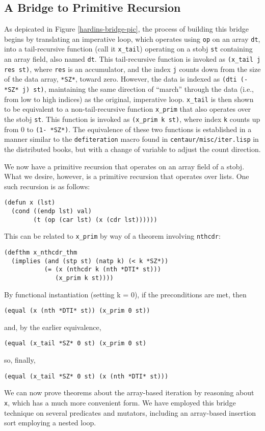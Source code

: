 \documentclass[copyright]{eptcs}
\begin{document}
\subsection{A Bridge to Primitive Recursion}\label{bridge}

As depicated in Figure \ref{hardins-bridge-pic}, the process of
building this bridge 
begins by translating an imperative loop, which operates using \texttt{op} on an array
\texttt{dt}, into a tail-recursive function (call it \texttt{x\_tail}) 
operating on a stobj \texttt{st} containing an array
field, also named \texttt{dt}.  This tail-recursive function is invoked as
\texttt{(x\_tail j res st)}, where \texttt{res} is an accumulator, and
the index \texttt{j} counts down from the size of the data array,
\texttt{*SZ*}, toward zero.  However, the data is indexed as
\texttt{(dti (- *SZ* j) st)}, maintaining the same direction of 
``march'' through the data (i.e., from low to high indices) as the 
original, imperative loop.  \texttt{x\_tail} is then shown
to be equivalent to a non-tail-recursive function \texttt{x\_prim}
that also operates over the stobj \texttt{st}.  This function is
invoked as \texttt{(x\_prim k st)}, where index \texttt{k} counts
up from 0 to \texttt{(1- *SZ*)}.  The equivalence of these two
functions is established in a manner similar to the
\texttt{defiteration} macro found in 
\texttt{centaur/misc/iter.lisp} in the distributed books, but with a
change of variable to adjust the count direction.

We now have a primitive recursion that operates on an array field of a
stobj.  What we desire, however, is a primitive recursion that
operates over lists.  One such recursion is as follows:

\begin{verbatim}
(defun x (lst)
  (cond ((endp lst) val)
        (t (op (car lst) (x (cdr lst))))))
\end{verbatim}

This can be related to \texttt{x\_prim} by way of a theorem involving
\texttt{nthcdr}:

\begin{verbatim}
(defthm x_nthcdr_thm
  (implies (and (stp st) (natp k) (< k *SZ*))
           (= (x (nthcdr k (nth *DTI* st))) 
              (x_prim k st))))
\end{verbatim}

By functional instantiation (setting k = 0), if the preconditions are met, then
\begin{verbatim}
(equal (x (nth *DTI* st)) (x_prim 0 st))
\end{verbatim}
and, by the earlier equivalence,
\begin{verbatim}
(equal (x_tail *SZ* 0 st) (x_prim 0 st)
\end{verbatim}
so, finally,
\begin{verbatim}
(equal (x_tail *SZ* 0 st) (x (nth *DTI* st)))
\end{verbatim}
We can now prove theorems about the array-based iteration by
reasoning about \texttt{x}, which has a much more convenient form.  
We have employed this bridge technique on several predicates and
mutators, including an array-based insertion sort employing a nested loop.
\end{document}
